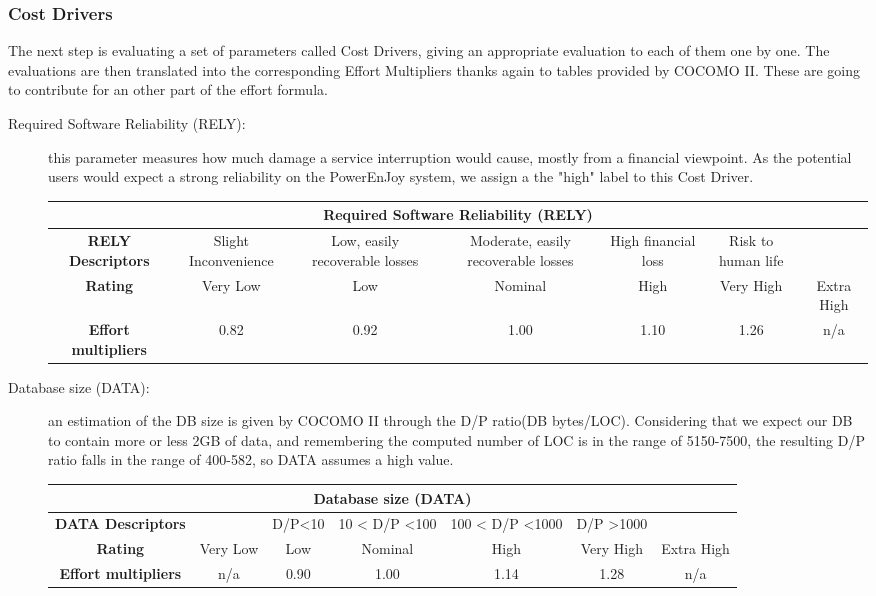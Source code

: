 \subsubsection{Cost Drivers}

The next step is evaluating a set of parameters called Cost Drivers, giving an appropriate evaluation to each of them one by one. The evaluations are then translated into the corresponding Effort Multipliers thanks again to tables provided by COCOMO II. These are going to contribute for an other part of the effort formula.

\begin{description}
\item[Required Software Reliability (RELY):] this parameter measures how much damage a service interruption would cause, mostly from a financial viewpoint. As the potential users would expect a strong reliability on the PowerEnJoy system, we assign a the "high" label to this Cost Driver.

\begin{tabular}{ | c | c | c | c | c | c | c | }
\hline
         \multicolumn{7}{|c|}{\textbf{Required Software Reliability (RELY)}} \\ \hline  \hline
	\textbf{RELY Descriptors} & Slight Inconvenience & Low, easily recoverable losses & Moderate, easily recoverable losses & High financial loss & Risk to human life& \\ \hline
	\textbf{Rating} & Very Low & Low & Nominal  & High & Very High & Extra High\\ \hline
	\textbf{Effort multipliers} & 0.82 & 0.92 & 1.00 & 1.10 & 1.26 &  n/a \\ \hline
\end{tabular}

\item[Database size (DATA):] an estimation of the DB size is given by COCOMO II through the D/P ratio(DB bytes/LOC). Considering that we expect our DB to contain more or less 2GB of data, and remembering the computed number of LOC is in the range of 5150-7500, the resulting D/P ratio falls in the range of 400-582, so DATA assumes a high value.

\begin{tabular}{ | c | c | c | c | c | c | c | }
\hline
         \multicolumn{7}{|c|}{\textbf{Database size (DATA)}} \\ \hline  \hline
	\textbf{DATA Descriptors} & & D/P<10&10 < D/P <100 &100 < D/P <1000 & D/P >1000  & \\ \hline
	\textbf{Rating}&Very Low & Low & Nominal  & High & Very High &Extra High\\ \hline
	\textbf{Effort multipliers} & n/a & 0.90 & 1.00 & 1.14 & 1.28 &  n/a \\ \hline
\end{tabular}


\end{description}
